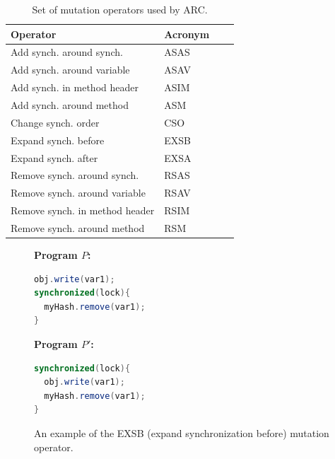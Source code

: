 \documentclass{llncs}
\begin{document}
\begin{table}[h]
\caption{Set of mutation operators used by ARC.}
\begin{center}
\begin{tabular}{|l|l|c|c|}
\hline
\textbf{Operator} & \textbf{Acronym} \\
\hline
Add synch. around synch. & ASAS \\
\hline
Add synch. around variable & ASAV \\
\hline
Add synch. in method header & ASIM \\
\hline
Add synch. around method & ASM  \\
\hline
Change synch. order & CSO  \\
\hline
Expand synch. before & EXSB  \\
\hline
Expand synch. after & EXSA  \\
\hline
Remove synch. around synch. & RSAS  \\
\hline
Remove synch. around variable & RSAV  \\
\hline
Remove synch. in method header & RSIM  \\
\hline
Remove synch. around method & RSM  \\
\hline
\end{tabular}
\label{tbl:operators}
\end{center}
\end{table}

\begin{figure}[h]
\vspace{2mm}
\begin{minipage}{5cm}

\footnotesize{\textbf{ Program $P$:}}
\begin{lstlisting}[language=Java, morekeywords={synchronize}]
obj.write(var1);
synchronized(lock){
  myHash.remove(var1);
}
\end{lstlisting}
\end{minipage}\hfill
\begin{minipage}{5cm}
\footnotesize{\textbf{ Program $P'$:}}
\begin{lstlisting}[language=Java, morekeywords={synchronize}]
synchronized(lock){
  obj.write(var1);
  myHash.remove(var1);
}
\end{lstlisting}
\end{minipage}

\caption{An example of the EXSB (expand synchronization before) mutation
operator.}
\label{fig:EXSB_example}
\end{figure}
\end{document}
